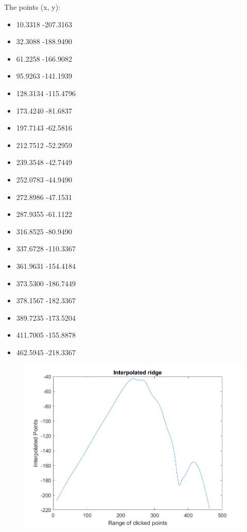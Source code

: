 \documentclass[]{article}
\providecommand{\tightlist}{%
  \setlength{\itemsep}{0pt}\setlength{\parskip}{0pt}}
\begin{document}
The points (x, y):

\begin{itemize}
\tightlist
\item
  10.3318 -207.3163
\item
  32.3088 -188.9490
\item
  61.2258 -166.9082
\item
  95.9263 -141.1939
\item
  128.3134 -115.4796
\item
  173.4240 -81.6837
\item
  197.7143 -62.5816
\item
  212.7512 -52.2959
\item
  239.3548 -42.7449
\item
  252.0783 -44.9490
\item
  272.8986 -47.1531
\item
  287.9355 -61.1122
\item
  316.8525 -80.9490
\item
  337.6728 -110.3367
\item
  361.9631 -154.4184
\item
  373.5300 -186.7449
\item
  378.1567 -182.3367
\item
  389.7235 -173.5204
\item
  411.7005 -155.8878
\item
  462.5945 -218.3367
\end{itemize}

\begin{figure}
\centering
\includegraphics{./Media/mountEverestPlot.png}
\caption{}
\end{figure}
\end{document}
